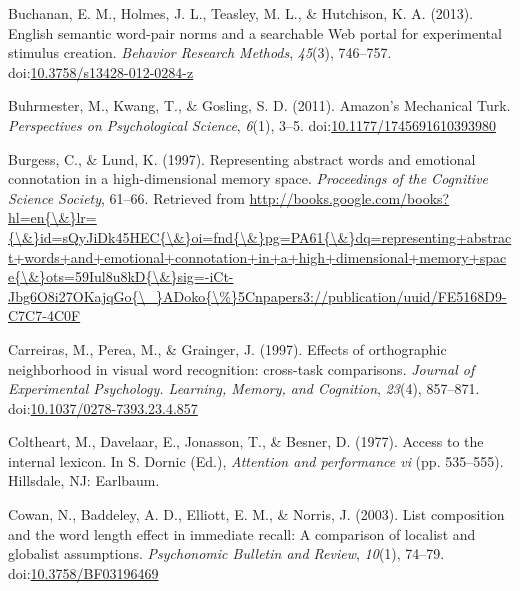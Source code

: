\documentclass[english,man]{apa6}
\theoremstyle{definition}
\theoremstyle{definition}
\theoremstyle{definition}
\theoremstyle{remark}
\begin{document}
\hypertarget{ref-Buchanan2013}{}
Buchanan, E. M., Holmes, J. L., Teasley, M. L., \& Hutchison, K. A.
(2013). English semantic word-pair norms and a searchable Web portal for
experimental stimulus creation. \emph{Behavior Research Methods},
\emph{45}(3), 746--757.
doi:\href{https://doi.org/10.3758/s13428-012-0284-z}{10.3758/s13428-012-0284-z}

\hypertarget{ref-Buhrmester2011}{}
Buhrmester, M., Kwang, T., \& Gosling, S. D. (2011). Amazon's Mechanical
Turk. \emph{Perspectives on Psychological Science}, \emph{6}(1), 3--5.
doi:\href{https://doi.org/10.1177/1745691610393980}{10.1177/1745691610393980}

\hypertarget{ref-Burgess1997}{}
Burgess, C., \& Lund, K. (1997). Representing abstract words and
emotional connotation in a high-dimensional memory space.
\emph{Proceedings of the Cognitive Science Society}, 61--66. Retrieved
from
\href{http://books.google.com/books?hl=en\%7B/\&\%7Dlr=\%7B/\&\%7Did=sQyJiDk45HEC\%7B/\&\%7Doi=fnd\%7B/\&\%7Dpg=PA61\%7B/\&\%7Ddq=representing+abstract+words+and+emotional+connotation+in+a+high+dimensional+memory+space\%7B/\&\%7Dots=59Iul8u8kD\%7B/\&\%7Dsig=-iCt-Jbg6O8i27OKajqGo\%7B/_\%7DADoko\%7B/\%\%7D5Cnpapers3://publication/uuid/FE5168D9-C7C7-4C0F}{http://books.google.com/books?hl=en\{\textbackslash{}\&\}lr=\{\textbackslash{}\&\}id=sQyJiDk45HEC\{\textbackslash{}\&\}oi=fnd\{\textbackslash{}\&\}pg=PA61\{\textbackslash{}\&\}dq=representing+abstract+words+and+emotional+connotation+in+a+high+dimensional+memory+space\{\textbackslash{}\&\}ots=59Iul8u8kD\{\textbackslash{}\&\}sig=-iCt-Jbg6O8i27OKajqGo\{\textbackslash{}\_\}ADoko\{\textbackslash{}\%\}5Cnpapers3://publication/uuid/FE5168D9-C7C7-4C0F}

\hypertarget{ref-Carreiras1997}{}
Carreiras, M., Perea, M., \& Grainger, J. (1997). Effects of
orthographic neighborhood in visual word recognition: cross-task
comparisons. \emph{Journal of Experimental Psychology. Learning, Memory,
and Cognition}, \emph{23}(4), 857--871.
doi:\href{https://doi.org/10.1037/0278-7393.23.4.857}{10.1037/0278-7393.23.4.857}

\hypertarget{ref-Coltheart1977}{}
Coltheart, M., Davelaar, E., Jonasson, T., \& Besner, D. (1977). Access
to the internal lexicon. In S. Dornic (Ed.), \emph{Attention and
performance vi} (pp. 535--555). Hillsdale, NJ: Earlbaum.

\hypertarget{ref-Cowan2003}{}
Cowan, N., Baddeley, A. D., Elliott, E. M., \& Norris, J. (2003). List
composition and the word length effect in immediate recall: A comparison
of localist and globalist assumptions. \emph{Psychonomic Bulletin and
Review}, \emph{10}(1), 74--79.
doi:\href{https://doi.org/10.3758/BF03196469}{10.3758/BF03196469}
\end{document}
